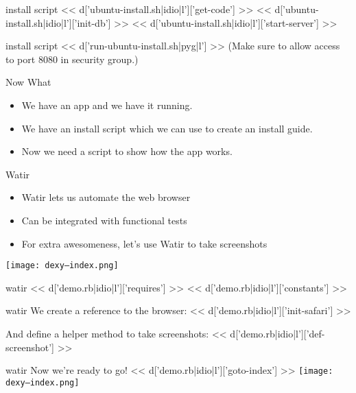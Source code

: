 \documentclass{beamer}
\begin{document}
\begin{frame}[fragile]{install script}
<< d['ubuntu-install.sh|idio|l']['get-code'] >>
<< d['ubuntu-install.sh|idio|l']['init-db'] >>
<< d['ubuntu-install.sh|idio|l']['start-server'] >>
\end{frame}

\begin{frame}[fragile]{install script}
<< d['run-ubuntu-install.sh|pyg|l'] >>
\normalsize
(Make sure to allow access to port 8080 in security group.)
\end{frame}

\begin{frame}{Now What}
\begin{itemize}
\item{We have an app and we have it running.}
\item{We have an install script which we can use to create an install guide.}
\item{Now we need a script to show how the app works.}
\end{itemize}
\end{frame}

\begin{frame}{Watir}
\begin{itemize}
\item{Watir lets us automate the web browser}
\item{Can be integrated with functional tests}
\item{For extra awesomeness, let's use Watir to take screenshots}
\end{itemize}
\texttt{[image: dexy--index.png]}
\end{frame}

\begin{frame}[fragile]{watir}
\scriptsize
<< d['demo.rb|idio|l']['requires'] >>
<< d['demo.rb|idio|l']['constants'] >>
\end{frame}

\begin{frame}[fragile]{watir}
\normalsize
We create a reference to the browser:
\scriptsize
<< d['demo.rb|idio|l']['init-safari'] >>

\normalsize
And define a helper method to take screenshots:
\scriptsize
<< d['demo.rb|idio|l']['def-screenshot'] >>
\end{frame}

\begin{frame}[fragile]{watir}
\normalsize
Now we're ready to go!
\scriptsize
<< d['demo.rb|idio|l']['goto-index'] >>
\texttt{[image: dexy--index.png]}
\end{frame}
\end{document}
